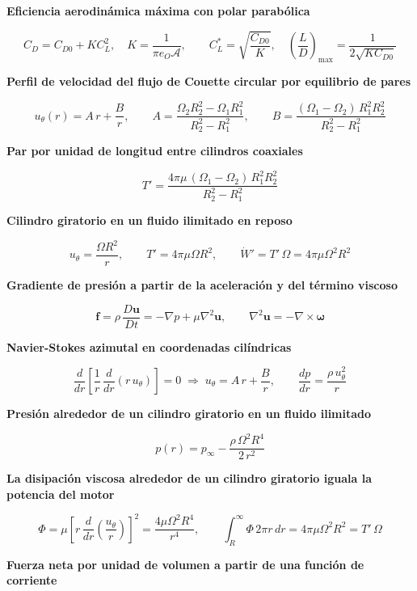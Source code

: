 \documentclass[10pt,openany]{book}
\begin{document}
\noindent\textbf{Eficiencia aerodinámica máxima con polar parabólica}

\[
C_D = C_{D0} + K C_L^{2},\quad K = \frac{1}{\pi e_O\mathcal{A}},\qquad C_L^{*} = \sqrt{\frac{C_{D0}}{K}},\quad \left(\frac{L}{D}\right)_{\max} = \frac{1}{2\sqrt{K C_{D0}}}
\]

\noindent\textbf{Perfil de velocidad del flujo de Couette circular por equilibrio de pares}

\[
u_\theta(r) = A\,r + \frac{B}{r},\qquad A = \frac{\Omega_2 R_2^{2} - \Omega_1 R_1^{2}}{R_2^{2} - R_1^{2}},\qquad B = \frac{(\Omega_1 - \Omega_2)\,R_1^{2} R_2^{2}}{R_2^{2} - R_1^{2}}
\]

\noindent\textbf{Par por unidad de longitud entre cilindros coaxiales}

\[
T' = \frac{4\pi\mu\,(\Omega_1 - \Omega_2)\,R_1^{2} R_2^{2}}{R_2^{2} - R_1^{2}}
\]

\noindent\textbf{Cilindro giratorio en un fluido ilimitado en reposo}

\[
u_\theta = \frac{\Omega R^{2}}{r},\qquad T' = 4\pi\mu\Omega R^{2},\qquad \dot W' = T'\,\Omega = 4\pi\mu\Omega^{2}R^{2}
\]

\noindent\textbf{Gradiente de presión a partir de la aceleración y del término viscoso}

\[
\mathbf{f} = \rho\,\frac{D\mathbf{u}}{Dt} = -\nabla p + \mu\nabla^{2}\mathbf{u},\qquad \nabla^{2}\mathbf{u} = -\nabla\times\boldsymbol{\omega}
\]

\noindent\textbf{Navier-Stokes azimutal en coordenadas cilíndricas}

\[
\frac{d}{dr}\!\left[\frac{1}{r}\,\frac{d}{dr}\left(r\,u_\theta\right)\right] = 0 \;\Rightarrow\; u_\theta = A\,r + \frac{B}{r},\qquad \frac{dp}{dr} = \frac{\rho\,u_\theta^{2}}{r}
\]

\noindent\textbf{Presión alrededor de un cilindro giratorio en un fluido ilimitado}

\[
p(r) = p_\infty - \frac{\rho\,\Omega^{2}R^{4}}{2\,r^{2}}
\]

\noindent\textbf{La disipación viscosa alrededor de un cilindro giratorio iguala la potencia del motor}

\[
\Phi = \mu\left[r\,\frac{d}{dr}\!\left(\frac{u_\theta}{r}\right)\right]^{2} = \frac{4\mu\Omega^{2}R^{4}}{r^{4}},\qquad \int_R^{\infty}\Phi\,2\pi r\,dr = 4\pi\mu\Omega^{2}R^{2} = T'\,\Omega
\]

\noindent\textbf{Fuerza neta por unidad de volumen a partir de una función de corriente}
\end{document}
